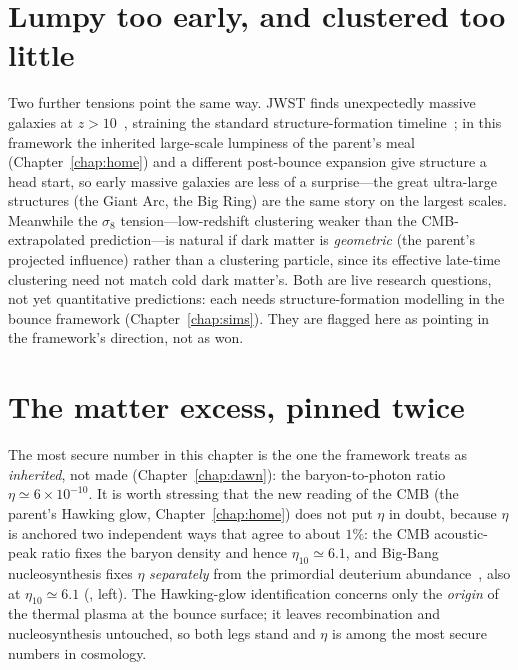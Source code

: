 \section{Lumpy too early, and clustered too little}
\label{sec:sigma8-jwst}

Two further tensions point the same way. JWST finds unexpectedly massive galaxies
at $z>10$~\citep{labbe2023}, straining the standard structure-formation
timeline~\citep{boylankolchin2023}; in this framework
the inherited large-scale lumpiness of the parent's meal (Chapter~\ref{chap:home})
and a different post-bounce expansion give structure a head start, so early massive
galaxies are less of a surprise---the great ultra-large structures (the Giant Arc,
the Big Ring) are the same story on the largest scales. Meanwhile the $\sigma_8$
tension---low-redshift clustering weaker than the CMB-extrapolated prediction---is
natural if dark matter is \emph{geometric} (the parent's projected influence) rather
than a clustering particle, since its effective late-time clustering need not match
cold dark matter's. Both are live research questions, not yet quantitative
predictions: each needs structure-formation modelling in the bounce framework
(Chapter~\ref{chap:sims}). They are flagged here as pointing in the framework's
direction, not as won.

\section{The matter excess, pinned twice}
\label{sec:spin-local}

The most secure number in this chapter is the one the framework treats as
\emph{inherited}, not made (Chapter~\ref{chap:dawn}): the baryon-to-photon ratio
$\eta\simeq6\times10^{-10}$. It is worth stressing that the new reading of the CMB
(the parent's Hawking glow, Chapter~\ref{chap:home}) does not put $\eta$ in doubt,
because $\eta$ is anchored two independent ways that agree to about $1\%$: the CMB
acoustic-peak ratio fixes the baryon density and hence $\eta_{10}\simeq6.1$, and
Big-Bang nucleosynthesis fixes $\eta$ \emph{separately} from the primordial
deuterium abundance~\citep{cooke2018,pitrou2018}, also at $\eta_{10}\simeq6.1$
(, left). The Hawking-glow identification concerns only the
\emph{origin} of the thermal plasma at the bounce surface; it leaves recombination
and nucleosynthesis untouched, so both legs stand and $\eta$ is among the most
secure numbers in cosmology.


